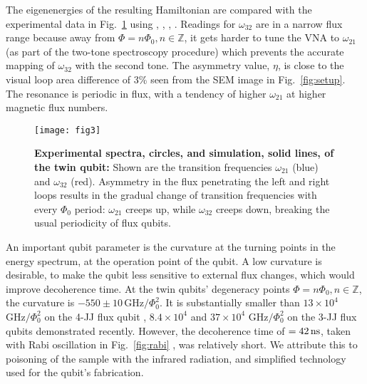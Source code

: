 \noindent The  eigenenergies of the resulting  Hamiltonian are compared with  the experimental
data in  Fig.~\ref{fig:experiment} using  , ,
, .  Readings for  $ \omega_{32} $ are in a narrow flux range
because  away  from $  \Phi  =  n  \Phi_0,  n\in\mathbb{Z} $,  it  gets  harder  to  tune the  VNA  to
$  \omega_{21} $  (as part  of the  two-tone spectroscopy  procedure) which  prevents the  accurate
mapping of  $ \omega_{32} $  with the second  tone.  The asymmetry  value, $ \eta  $, is close  to the
visual loop  area difference  of 3\%  seen from  the SEM  image in  Fig.~\ref{fig:setup}.  The
resonance is  periodic in flux,  with a  tendency of higher  $\omega_{21}$ at higher  magnetic flux
numbers.

\begin{figure}[h]
  \texttt{[image: fig3]}
  \caption{\small \textbf{Experimental spectra,  circles, and simulation, solid  lines, of the
      twin   qubit:}  Shown   are  the   transition  frequencies   $  \omega_{21}   $  (blue)   and
    $ \omega_{32}$ (red).   Asymmetry in the flux  penetrating the left and right  loops results in
    the gradual change of transition frequencies with  every $ \Phi_{0} $ period: $\omega_{21}$ creeps
    up,   while   $\omega_{32}$   creeps   down,   breaking   the   usual   periodicity   of   flux
    qubits.  \label{fig:experiment}}
\end{figure}
 
An important qubit parameter is the curvature at the turning points in the energy spectrum, at
the operation  point of  the qubit.   A low  curvature is  desirable, to  make the  qubit less
sensitive to external flux changes, which would improve decoherence time.  At the twin qubits'
degeneracy    points    $     \Phi    =    n\Phi_0,    n\in\mathbb{Z}    $,     the    curvature    is
$   -550\pm10\,\text{GHz}/\Phi_0^2  $.    It  is   substantially   smaller  than   $  13\times   10^4$
$ \text{GHz}/\Phi_0^2$ on the 4-JJ flux qubit  \cite{stern2014}, $ 8.4 \times 10^4$ \cite{zhu2010} and
$ 37\times 10^{4}$  $ \text{GHz}/\Phi_0^2$ \cite{gustavsson2012} on the 3-JJ  flux qubits demonstrated
recently. However, the decoherence  time of $ = 42\,\text{ns} $,  taken with Rabi oscillation
in Fig.~\ref{fig:rabi} \cite{Bylander2011,Ithier2005,Martinis2003},  was relatively short.  We
attribute  this  to poisoning  of  the  sample with  the  infrared  radiation, and  simplified
technology used for the qubit's fabrication.

